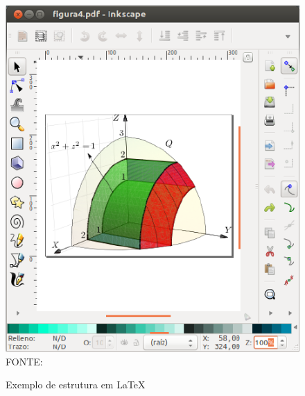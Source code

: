 \begin{figure}[H]
	\centering
	\caption{Exemplo de estrutura em LaTeX}
	\includegraphics[scale=0.5]{img/fig07.png}\label{fig07}\\
	FONTE: \cite[p.~112]{latex-walter}
\end{figure}

